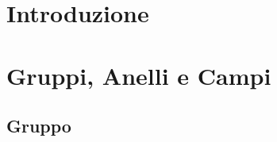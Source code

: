 


\section{Introduzione}

\textsf{\small }


\newpage


\section{Gruppi, Anelli e Campi} %

\textsf{\small }



\subsection{Gruppo}

\textsf{\small }

